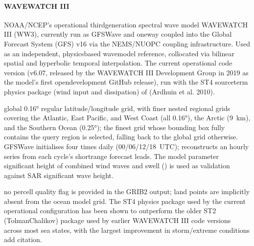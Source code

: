 \documentclass[a4paper,10pt,english]{sphinxmanual}
\begin{document}
\paragraph{WAVEWATCH III}
\label{\detokenize{05_reference_datasets:wavewatch-iii}}
\sphinxAtStartPar
{}

\sphinxAtStartPar
NOAA/NCEP’s operational third\sphinxhyphen{}generation spectral wave model WAVEWATCH III (WW3), currently run as GFS\sphinxhyphen{}Wave and one\sphinxhyphen{}way coupled into the Global Forecast System (GFS) v16 via the NEMS/NUOPC coupling infrastructure. Used as an independent, physics\sphinxhyphen{}based wave\sphinxhyphen{}model reference, collocated via bilinear spatial and hyperbolic temporal interpolation. The current operational code version (v6.07, released by the WAVEWATCH III Development Group in 2019 as the model’s first open\sphinxhyphen{}development GitHub release), run with the ST4 source\sphinxhyphen{}term physics package (wind input and dissipation) of (Ardhuin et al. 2010).

\sphinxAtStartPar
{}

\sphinxAtStartPar
global 0.16° regular latitude/longitude grid, with finer nested regional grids covering the Atlantic, East Pacific, and West Coast (all 0.16°), the Arctic (9 km), and the Southern Ocean (0.25°); the finest grid whose bounding box fully contains the query region is selected, falling back to the global grid otherwise. GFS\sphinxhyphen{}Wave initialises four times daily (00/06/12/18 UTC);  reconstructs an hourly series from each cycle’s short\sphinxhyphen{}range forecast leads. The model parameter significant height of combined wind waves and swell () is used as validation against SAR significant wave height.

\sphinxAtStartPar
{}

\sphinxAtStartPar
no per\sphinxhyphen{}cell quality flag is provided in the GRIB2 output; land points are implicitly absent from the ocean model grid. The ST4 physics package used by the current operational configuration has been shown to outperform the older ST2 (Tolman\textendash{}Chalikov) package used by earlier WAVEWATCH III code versions across most sea states, with the largest improvement in storm/extreme conditions add citation.

\sphinxAtStartPar
{}
\end{document}
